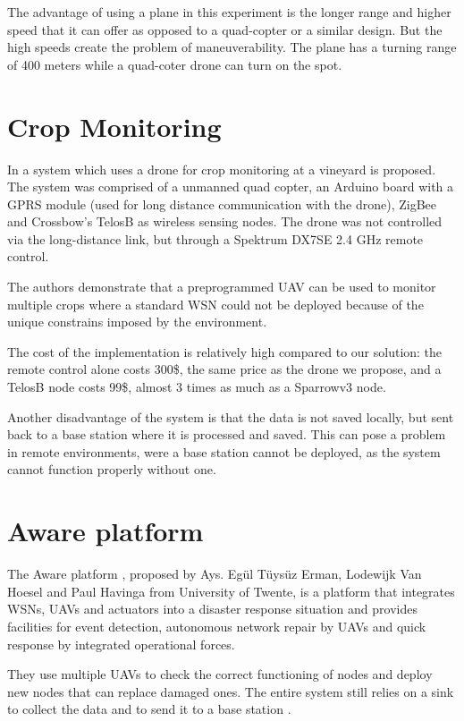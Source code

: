 The advantage of using a plane in this experiment is the longer range and higher speed that it can offer as opposed to a quad-copter or a similar design.  But the high speeds create the problem of maneuverability. The plane has a turning range of 400 meters while a quad-coter drone can turn on the spot.

\section{Crop Monitoring}

In \cite{valente2011air} a system which uses a drone for crop monitoring at a vineyard is proposed. The system was comprised of a unmanned quad copter, an Arduino board with a GPRS module (used for long distance communication with  the drone), ZigBee and Crossbow’s TelosB as wireless sensing nodes. The drone was not controlled via the long-distance link, but through a Spektrum DX7SE 2.4 GHz remote control.

The authors demonstrate that a preprogrammed UAV can be used to monitor multiple crops where a standard WSN could not be deployed because of the unique constrains imposed by the environment.

The cost of the implementation is relatively high compared to our solution: the remote control alone costs 300\$, the same price as the drone we propose, and a TelosB node costs 99\$, almost 3 times as much as a Sparrowv3 node.

Another disadvantage of the system is that the data is not saved locally, but sent back to a base station where it is processed and saved. This can pose a problem in remote environments, were a base station cannot be deployed, as the system cannot function properly without one.

\section{Aware platform}

The Aware platform \cite{ollero2007aware}, proposed by Ays. Egül Tüysüz Erman, Lodewijk Van Hoesel and Paul Havinga from University of Twente, is a platform that integrates WSNs, UAVs and actuators into a disaster response situation and provides facilities for event detection, autonomous network repair by UAVs and quick response by integrated operational forces.

They use multiple UAVs to check the correct functioning of nodes and deploy new nodes that can replace damaged ones. The entire system still relies on a sink to collect the data and to send it to a base station \cite{erman2008enabling}.
